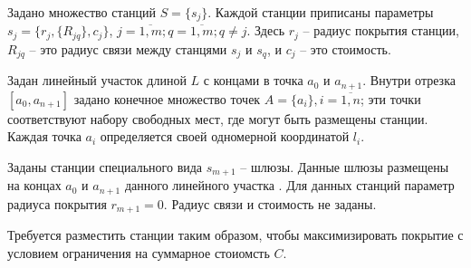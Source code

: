Задано множество станций $S = \{s_j\}$. Каждой станции приписаны параметры $s_j = \{r_j, \{R_{jq}\}, c_j \}$, $j = \overline{1,m}; q = \overline{1,m}; q \neq j$. Здесь $r_j$ -- радиус покрытия станции, $R_{jq}$ -- это радиус связи между станцями $s_j$ и $s_q$, и $c_j$ -- это стоимость. 

Задан линейный участок длиной $L$ с концами в точка $a_0$ и $a_{n+1}$. Внутри  отрезка $[a_0, a_{n+1}]$ задано конечное множество точек $A=\{a_i\}, i=\overline{1,n}$; эти точки соответствуют набору свободных мест, где могут быть размещены станции. Каждая точка $a_i$ определяется своей одномерной координатой $l_i$.

Заданы станции специального вида $s_{m+1}$ -- шлюзы. Данные шлюзы размещены на концах $a_0$ и $a_{n+1}$ данного линейного участка . Для данных станций параметр радиуса покрытия $r_{m+1}=0$. Радиус связи и стоимость не заданы.

Требуется разместить станции таким образом, чтобы максимизировать покрытие с условием ограничения на суммарное стоиомсть $C$.

 









